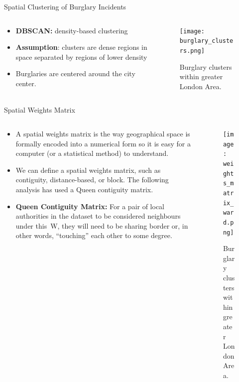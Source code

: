 \documentclass[10pt, aspectratio=169]{beamer}
\begin{document}
\begin{frame}{Spatial Clustering of Burglary Incidents}
    \begin{columns}
        \begin{column}{0.5\textwidth}
            \begin{itemize}
                \item \textbf{DBSCAN:} density-based clustering
                \item \textbf{Assumption}: clusters are dense regions in space separated by regions of lower density
                \item Burglaries are centered around the city center.
            \end{itemize}
        \end{column}
        \begin{column}{0.5\textwidth}
            \begin{figure}
            \centering
                \texttt{[image: burglary\_clusters.png]}
                \caption{Burglary clusters within greater London Area.}
            \end{figure}
        \end{column}
    \end{columns}
\end{frame}

\begin{frame}{Spatial Weights Matrix}
    \begin{columns}
        \begin{column}{0.5\textwidth}
            \begin{itemize}
                \item A spatial weights matrix is the way geographical space is formally encoded into
                a numerical form so it is easy for a computer (or a statistical method) to understand.
                \item We can define a spatial weights matrix, such as contiguity, distance-based,
                or block. The following analysis has used a Queen contiguity matrix.
                \item \textbf{Queen Contiguity Matrix:} For a pair of local authorities in the dataset to be
                considered neighbours under this W, they will need to be sharing border or, in other words, “touching” each other to some degree.

            \end{itemize}
        \end{column}
        \begin{column}{0.5\textwidth}
            \begin{figure}
            \centering
                \texttt{[image: weights\_matrix\_ward.png]}
                \caption{Burglary clusters within greater London Area.}
            \end{figure}
        \end{column}
    \end{columns}
\end{frame}
\end{document}
